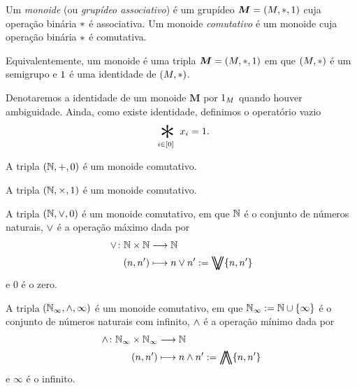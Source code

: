 \begin{definition}
Um \emph{monoide} (ou \emph{grupídeo associativo}) é um grupídeo $\bm M=(M,\ast,1)$ cuja operação binária $\ast$ é associativa. Um monoide \emph{comutativo} é um monoide cuja operação binária $\ast$ é comutativa.
\end{definition}

Equivalentemente, um monoide é uma tripla $\bm M=(M,\ast,1)$ em que $(M,\ast)$ é um semigrupo e $1$ é uma identidade de $(M,\ast)$.

\begin{notation}
Denotaremos a identidade de um monoide $\bm M$ por $1_M$ quando houver ambiguidade. Ainda, como existe identidade, definimos o operatório vazio
	\begin{equation*}
	\bigopb_{i \in [0]} x_i = \id.
	\end{equation*}
\end{notation}

\begin{example}
A tripla $(\mathbb{N},+,0)$ é um monoide comutativo.
\end{example}

\begin{example}
A tripla $(\mathbb{N},\times,1)$ é um monoide comutativo.
\end{example}

\begin{example}
A tripla $(\mathbb{N},\mathbin{\vee},0)$ é um monoide comutativo, em que $\mathbb{N}$ é o conjunto de números naturais, $\mathbin{\vee}$ é a operação máximo dada por
	\begin{align*}
	\func{\opmax}{\N \times \N}{\N}{(n,n')}{n \opmax n' := \max \{n,n'\}}
	\end{align*}
e $0$ é o zero.
\end{example}

\begin{example}
A tripla $(\mathbb{N}_{\infty},\mathbin{\wedge},\infty)$ é um monoide comutativo, em que $\mathbb{N}_{\infty} := \mathbb{N} \cup \{\infty\}$ é o conjunto de números naturais com infinito, $\mathbin{\wedge}$ é a operação mínimo dada por
	\begin{align*}
	\func{\opmin}{\N_{\infty} \times \N_{\infty}}{\N}{(n,n')}{n \opmin n' := \min \{n,n'\}}
	\end{align*}
e $\infty$ é o infinito.
\end{example}

